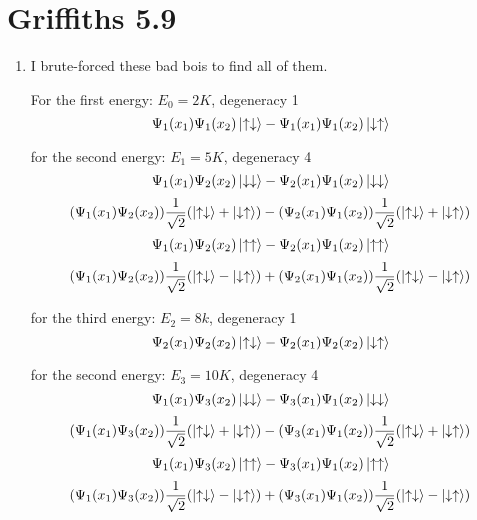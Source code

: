 \documentclass[11pt]{article}
\begin{document}
\newpage

\section*{Griffiths 5.9}
\begin{enumerate}[label=\alph*)]
\item 
I brute-forced these bad bois to find all of them. 

For the first energy: $E_0 = 2K$, degeneracy 1
\[\Psi_1(x_1)\Psi_1(x_2)\ket{\uparrow\downarrow} - \Psi_1(x_1) \Psi_1(x_2)\ket{\downarrow\uparrow}\]

for the second energy: $E_1 = 5K$, degeneracy 4
\[\Psi_1(x_1)\Psi_2(x_2)\ket{\downarrow\downarrow} - \Psi_2(x_1) \Psi_1(x_2)\ket{\downarrow\downarrow}\]
\[(\Psi_1(x_1)\Psi_2(x_2))\frac{1}{\sqrt{2}}(\ket{\uparrow\downarrow} + \ket{\downarrow\uparrow}) - (\Psi_2(x_1)\Psi_1(x_2))\frac{1}{\sqrt{2}}(\ket{\uparrow\downarrow} + \ket{\downarrow\uparrow})\]
\[\Psi_1(x_1)\Psi_2(x_2)\ket{\uparrow\uparrow} - \Psi_2(x_1) \Psi_1(x_2)\ket{\uparrow\uparrow}\]
\[(\Psi_1(x_1)\Psi_2(x_2))\frac{1}{\sqrt{2}}(\ket{\uparrow\downarrow} - \ket{\downarrow\uparrow}) + (\Psi_2(x_1)\Psi_1(x_2))\frac{1}{\sqrt{2}}(\ket{\uparrow\downarrow} - \ket{\downarrow\uparrow})\]

for the third energy: $E_2 = 8k$, degeneracy 1
\[\Psi_2(x_1)\Psi_2(x_2)\ket{\uparrow\downarrow} - \Psi_2(x_1) \Psi_2(x_2)\ket{\downarrow\uparrow}\]

for the second energy: $E_3 = 10K$, degeneracy 4
\[\Psi_1(x_1)\Psi_3(x_2)\ket{\downarrow\downarrow} - \Psi_3(x_1) \Psi_1(x_2)\ket{\downarrow\downarrow}\]
\[(\Psi_1(x_1)\Psi_3(x_2))\frac{1}{\sqrt{2}}(\ket{\uparrow\downarrow} + \ket{\downarrow\uparrow}) - (\Psi_3(x_1)\Psi_1(x_2))\frac{1}{\sqrt{2}}(\ket{\uparrow\downarrow} + \ket{\downarrow\uparrow})\]
\[\Psi_1(x_1)\Psi_3(x_2)\ket{\uparrow\uparrow} - \Psi_3(x_1) \Psi_1(x_2)\ket{\uparrow\uparrow}\]
\[(\Psi_1(x_1)\Psi_3(x_2))\frac{1}{\sqrt{2}}(\ket{\uparrow\downarrow} - \ket{\downarrow\uparrow}) + (\Psi_3(x_1)\Psi_1(x_2))\frac{1}{\sqrt{2}}(\ket{\uparrow\downarrow} - \ket{\downarrow\uparrow})\]

\end{enumerate}

\newpage
\end{document}
